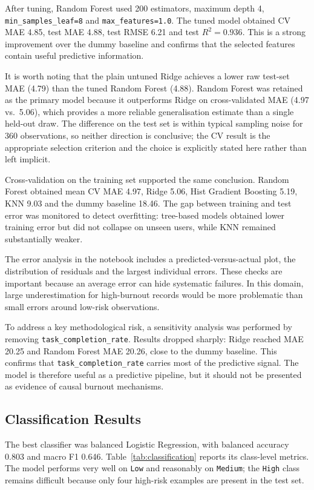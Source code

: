 \documentclass[conference]{IEEEtran}
\begin{document}
After tuning, Random Forest used 200 estimators, maximum depth 4,
\texttt{min\_samples\_leaf=8} and \texttt{max\_features=1.0}. The tuned model
obtained CV MAE 4.85, test MAE 4.88, test RMSE 6.21 and test $R^2=0.936$. This
is a strong improvement over the dummy baseline and confirms that the selected
features contain useful predictive information.

It is worth noting that the plain untuned Ridge achieves a lower raw test-set
MAE (4.79) than the tuned Random Forest (4.88). Random Forest was retained as
the primary model because it outperforms Ridge on cross-validated MAE (4.97
vs.\ 5.06), which provides a more reliable generalisation estimate than a single
held-out draw. The difference on the test set is within typical sampling noise
for 360 observations, so neither direction is conclusive; the CV result is the
appropriate selection criterion and the choice is explicitly stated here rather
than left implicit.

Cross-validation on the training set supported the same conclusion. Random
Forest obtained mean CV MAE 4.97, Ridge 5.06, Hist Gradient Boosting 5.19, KNN
9.03 and the dummy baseline 18.46. The gap between training and test error was
monitored to detect overfitting: tree-based models obtained lower training error
but did not collapse on unseen users, while KNN remained substantially weaker.

The error analysis in the notebook includes a predicted-versus-actual plot, the
distribution of residuals and the largest individual errors. These checks are
important because an average error can hide systematic failures. In this domain,
large underestimation for high-burnout records would be more problematic than
small errors around low-risk observations.

To address a key methodological risk, a sensitivity analysis was performed by
removing \texttt{task\_completion\_rate}. Results dropped sharply: Ridge reached
MAE 20.25 and Random Forest MAE 20.26, close to the dummy baseline. This confirms
that \texttt{task\_completion\_rate} carries most of the predictive signal. The
model is therefore useful as a predictive pipeline, but it should not be
presented as evidence of causal burnout mechanisms.

\subsection{Classification Results}

The best classifier was balanced Logistic Regression, with balanced accuracy
0.803 and macro F1 0.646. Table~\ref{tab:classification} reports its class-level
metrics. The model performs very well on \texttt{Low} and reasonably on
\texttt{Medium}; the \texttt{High} class remains difficult because only four
high-risk examples are present in the test set.
\end{document}
